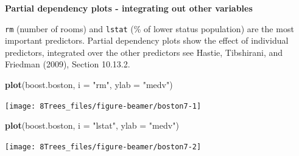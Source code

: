\documentclass[10pt,ignorenonframetext,]{beamer}
\newenvironment{Shaded}{\begin{snugshade}}{\end{snugshade}}
\newcommand{\KeywordTok}[1]{\textcolor[rgb]{0.13,0.29,0.53}{\textbf{#1}}}
\newcommand{\DataTypeTok}[1]{\textcolor[rgb]{0.13,0.29,0.53}{#1}}
\newcommand{\StringTok}[1]{\textcolor[rgb]{0.31,0.60,0.02}{#1}}
\newcommand{\NormalTok}[1]{#1}
\begin{document}
\begin{frame}[fragile]

\textbf{Partial dependency plots - integrating out other variables }

\small
\texttt{rm} (number of rooms) and \texttt{lstat} (\% of lower status
population) are the most important predictors. Partial dependency plots
show the effect of individual predictors, integrated over the other
predictors see Hastie, Tibshirani, and Friedman (2009), Section 10.13.2.

\scriptsize

\begin{Shaded}
\begin{Highlighting}[]
\KeywordTok{plot}\NormalTok{(boost.boston, }\DataTypeTok{i =} \StringTok{"rm"}\NormalTok{, }\DataTypeTok{ylab =} \StringTok{"medv"}\NormalTok{)}
\end{Highlighting}
\end{Shaded}

\begin{center}\texttt{[image: 8Trees\_files/figure-beamer/boston7-1]} \end{center}

\begin{Shaded}
\begin{Highlighting}[]
\KeywordTok{plot}\NormalTok{(boost.boston, }\DataTypeTok{i =} \StringTok{"lstat"}\NormalTok{, }\DataTypeTok{ylab =} \StringTok{"medv"}\NormalTok{)}
\end{Highlighting}
\end{Shaded}

\begin{center}\texttt{[image: 8Trees\_files/figure-beamer/boston7-2]} \end{center}

\end{frame}
\end{document}
